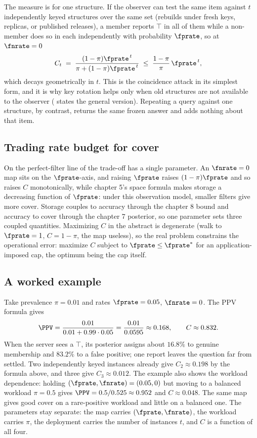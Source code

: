 The measure is for one structure. If the observer can test the same item
against $t$ independently keyed structures over the same set (rebuilds
under fresh keys, replicas, or published releases), a member reports
$\top$ in all of them while a non-member does so in each independently
with probability $\fprate$, so at $\fnrate = 0$
\[
  C_t \;=\; \frac{(1 - \pi)\fprate^{\,t}}{\pi + (1 - \pi)\fprate^{\,t}}
  \;\le\; \frac{1 - \pi}{\pi}\,\fprate^{\,t},
\]
which decays geometrically in $t$. This is the coincidence attack in its
simplest form, and it is why key rotation helps
only when old structures are not available to the observer
( states the general version). Repeating a
query against one structure, by contrast, returns the same frozen answer
and adds nothing about that item.

\subsection*{Trading rate budget for cover}

On the perfect-filter line of  the
trade-off has a single parameter. An $\fnrate = 0$ map sits on the
$\fprate$-axis, and raising $\fprate$ raises $(1-\pi)\fprate$ and so
raises $C$ monotonically, while chapter 5's space formula makes storage a
decreasing function of $\fprate$: under this observation model, smaller
filters give more cover. Storage couples to accuracy through the chapter 8
bound and accuracy to cover through the chapter 7 posterior, so one
parameter sets three coupled quantities. Maximizing $C$ in the abstract is
degenerate (walk to $\fprate = 1$, $C = 1 - \pi$, the map useless), so the
real problem constrains the operational error: maximize $C$ subject to
$\fprate \le \fprate^*$ for an application-imposed cap, the optimum being
the cap itself.

\subsection*{A worked example}

Take prevalence $\pi = 0.01$ and rates $\fprate = 0.05$, $\fnrate = 0$.
The PPV formula gives
\[
  \PPV = \frac{0.01}{0.01 + 0.99 \cdot 0.05} = \frac{0.01}{0.0595}
  \approx 0.168,
  \qquad C \approx 0.832.
\]
When the server sees a $\top$, its posterior assigns about $16.8\%$ to
genuine membership and $83.2\%$ to a false positive; one report leaves
the question far from settled. Two independently keyed instances already
give $C_2 \approx 0.198$ by the formula above, and three give $C_3 \approx
0.012$. The example also shows the workload
dependence: holding $(\fprate, \fnrate) = (0.05, 0)$ but moving to a
balanced workload $\pi = 0.5$ gives $\PPV = 0.5/0.525 \approx 0.952$ and
$C \approx 0.048$. The same map gives good cover on a rare-positive
workload and little on a balanced one. The parameters stay separate: the
map carries $(\fprate, \fnrate)$, the workload carries $\pi$, the
deployment carries the number of instances $t$, and $C$ is a function of
all four.
